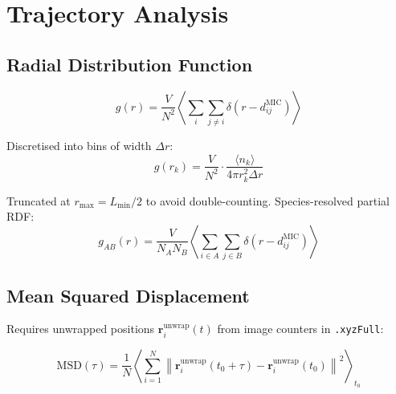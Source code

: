 \documentclass[11pt, a4paper, oneside]{article}
\newcommand{\rvec}{\mathbf{r}}
\begin{document}
\section{Trajectory Analysis}
\label{sec:analysis}

\subsection{Radial Distribution Function}
\label{sec:rdf}

\begin{equation}
  g(r) = \frac{V}{N^2}
         \left\langle
           \sum_{i} \sum_{j \neq i}
           \delta\!\left(r - d_{ij}^{\mathrm{MIC}}\right)
         \right\rangle
  \label{eq:rdf}
\end{equation}

Discretised into bins of width $\Delta r$:
\begin{equation}
  g(r_k) = \frac{V}{N^2} \cdot
            \frac{\langle n_k \rangle}{4\pi r_k^2 \Delta r}
  \label{eq:rdf_bin}
\end{equation}

Truncated at $r_{\max} = L_{\min}/2$ to avoid double-counting.
Species-resolved partial RDF:
\begin{equation}
  g_{AB}(r) = \frac{V}{N_A N_B}
              \left\langle
                \sum_{i \in A} \sum_{j \in B}
                \delta\!\left(r - d_{ij}^{\mathrm{MIC}}\right)
              \right\rangle
  \label{eq:rdf_partial}
\end{equation}

\subsection{Mean Squared Displacement}
\label{sec:msd}

Requires unwrapped positions $\rvec_i^{\mathrm{unwrap}}(t)$
from image counters in \texttt{.xyzFull}:

\begin{equation}
  \mathrm{MSD}(\tau) =
  \frac{1}{N}
  \left\langle
    \sum_{i=1}^{N}
    \left\|
      \rvec_i^{\mathrm{unwrap}}(t_0 + \tau) - \rvec_i^{\mathrm{unwrap}}(t_0)
    \right\|^2
  \right\rangle_{t_0}
  \label{eq:msd}
\end{equation}
\end{document}
